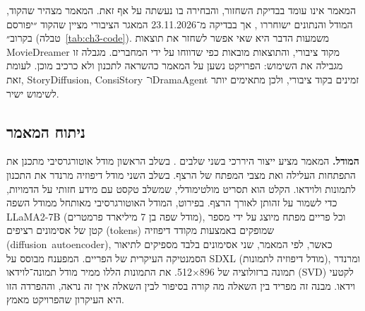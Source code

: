 המאמר אינו עומד בבדיקת השחזור, והבחירה בו נעשתה על אף זאת. המאמר מצהיר שהקוד, המודל והנתונים ישוחררו \cite{zhao2025moviedreamer}, אך בבדיקה מ־23.11.2026 המאגר הציבורי מציין שהקוד ״יפורסם בקרוב״ (טבלה~\ref{tab:ch3-code}). משמעות הדבר היא שאי אפשר לשחזר את תוצאות \textenglish{MovieDreamer} מקוד ציבורי, והתוצאות מובאות כפי שדווחו על ידי המחברים. מגבלה זו מגבילה את השימוש: הפרויקט נשען על המאמר כהשראה לתכנון ולא כרכיב מוכן. לעומת זאת, \textenglish{StoryDiffusion}, \textenglish{ConsiStory} ו־\textenglish{DramaAgent} זמינים בקוד ציבורי, ולכן מתאימים יותר לשימוש ישיר.

\subsection{ניתוח המאמר}
\textbf{המודל.} המאמר מציע ייצור היררכי בשני שלבים \cite{zhao2025moviedreamer}. בשלב הראשון מודל אוטורגרסיבי מתכנן את התפתחות העלילה ואת מצבי המפתח של הרצף. בשלב השני מודל דיפוזיה מרנדר את התכנון לתמונות ולוידאו. הקלט הוא תסריט מולטימודלי, שמשלב טקסט עם מידע חזותי על הדמויות, כדי לשמור על זהותן לאורך הרצף. בפירוט, המודל האוטורגרסיבי מאותחל ממודל השפה \textenglish{LLaMA2-7B} (מודל שפה בן 7 מיליארד פרמטרים), וכל פריים מפתח מיוצג על ידי מספר קטן של אסימונים רציפים (\textenglish{tokens}) שמופקים באמצעות מקודד דיפוזיה (\mbox{\textenglish{diffusion autoencoder}}), כאשר, לפי המאמר, שני אסימונים בלבד מספיקים לתיאור הסמנטיקה העיקרית של הפריים. המפענח מבוסס על \textenglish{SDXL} (מודל דיפוזיה לתמונות), ומרנדר תמונה ברזולוציה של \textenglish{896$\times$512}. את התמונות הללו ממיר מודל תמונה־לוידאו (\textenglish{SVD}) לקטעי וידאו. מבנה זה מפריד בין השאלה מה קורה בסיפור לבין השאלה איך זה נראה, וההפרדה הזו היא העיקרון שהפרויקט מאמץ.

